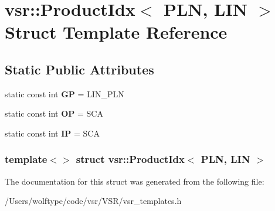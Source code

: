 \hypertarget{structvsr_1_1_product_idx_3_01_p_l_n_00_01_l_i_n_01_4}{\section{vsr\-:\-:Product\-Idx$<$ P\-L\-N, L\-I\-N $>$ Struct Template Reference}
\label{structvsr_1_1_product_idx_3_01_p_l_n_00_01_l_i_n_01_4}
}
\subsection*{Static Public Attributes}
\begin{DoxyCompactItemize}
\item 
\hypertarget{structvsr_1_1_product_idx_3_01_p_l_n_00_01_l_i_n_01_4_a0e91c1872b942916395c8603f2f42e3a}{static const int {\bfseries G\-P} = L\-I\-N\-\_\-\-P\-L\-N}\label{structvsr_1_1_product_idx_3_01_p_l_n_00_01_l_i_n_01_4_a0e91c1872b942916395c8603f2f42e3a}

\item 
\hypertarget{structvsr_1_1_product_idx_3_01_p_l_n_00_01_l_i_n_01_4_a6bc469c525266ad394bfada89e0f0461}{static const int {\bfseries O\-P} = S\-C\-A}\label{structvsr_1_1_product_idx_3_01_p_l_n_00_01_l_i_n_01_4_a6bc469c525266ad394bfada89e0f0461}

\item 
\hypertarget{structvsr_1_1_product_idx_3_01_p_l_n_00_01_l_i_n_01_4_a08ea103ec251118cae3b2de447d5ff96}{static const int {\bfseries I\-P} = S\-C\-A}\label{structvsr_1_1_product_idx_3_01_p_l_n_00_01_l_i_n_01_4_a08ea103ec251118cae3b2de447d5ff96}

\end{DoxyCompactItemize}
\subsubsection*{template$<$$>$ struct vsr\-::\-Product\-Idx$<$ P\-L\-N, L\-I\-N $>$}



The documentation for this struct was generated from the following file\-:\begin{DoxyCompactItemize}
\item 
/\-Users/wolftype/code/vsr/\-V\-S\-R/vsr\-\_\-templates.\-h\end{DoxyCompactItemize}
